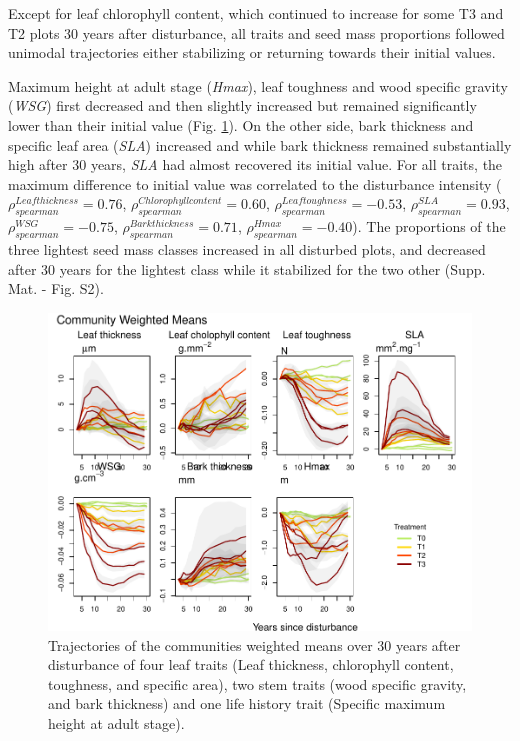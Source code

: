 \documentclass[
  11pt,
  french,
  A4paper,
  extrafontsizes,onecolumn,openright
  ]{memoir}
\begin{document}
Except for leaf chlorophyll content, which continued to increase for
some T3 and T2 plots 30 years after disturbance, all traits and seed
mass proportions followed unimodal trajectories either stabilizing or
returning towards their initial values.

Maximum height at adult stage (\emph{Hmax}), leaf toughness and wood
specific gravity (\emph{WSG}) first decreased and then slightly
increased but remained significantly lower than their initial value
(Fig. \ref{fig:CWM}). On the other side, bark thickness and specific
leaf area (\emph{SLA}) increased and while bark thickness remained
substantially high after 30 years, \emph{SLA} had almost recovered its
initial value. For all traits, the maximum difference to initial value
was correlated to the disturbance intensity
(\(\rho_{spearman}^{Leaf thickness}=0.76\),
\(\rho_{spearman}^{Chlorophyll content}=0.60\),
\(\rho_{spearman}^{Leaf toughness}=-0.53\),
\(\rho_{spearman}^{SLA}=0.93\), \(\rho_{spearman}^{WSG}=-0.75\),
\(\rho_{spearman}^{Bark thickness}=0.71\),
\(\rho_{spearman}^{Hmax}=-0.40\)). The proportions of the three lightest
seed mass classes increased in all disturbed plots, and decreased after
30 years for the lightest class while it stabilized for the two other
(Supp. Mat. - Fig. S2).

\begin{figure}

{\centering \includegraphics[width=1\linewidth]{Manuscript_files/figure-latex/CWM-1} 

}

\caption{Trajectories of the communities weighted means over 30 years after disturbance of four leaf traits (Leaf thickness, chlorophyll content, toughness, and specific area), two stem traits (wood specific gravity, and bark thickness) and one life history trait (Specific maximum height at adult stage). }\label{fig:CWM}
\end{figure}
\end{document}
